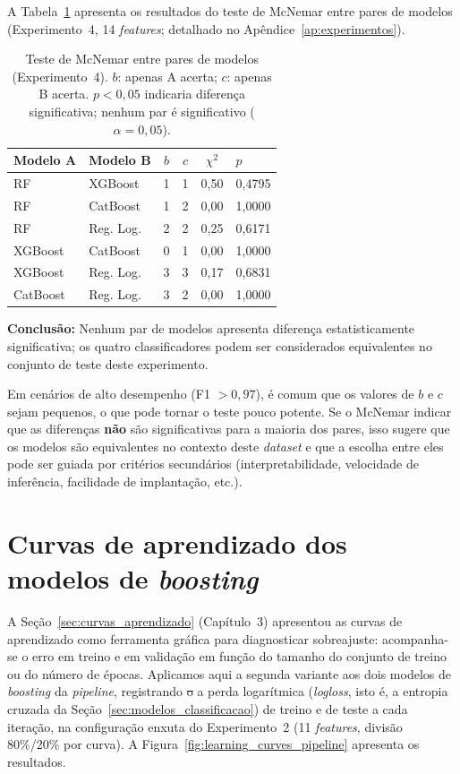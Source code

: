 \documentclass[msc]{on} %
\makeatletter
\providecommand{\DIFaddtex}[1]{{\protect\color{red}#1}} %
\providecommand{\DIFdeltex}[1]{{\protect\color{red}\sout{#1}}} %
\providecommand{\DIFaddbegin}{} %
\providecommand{\DIFaddend}{} %
\providecommand{\DIFdelbegin}{} %
\providecommand{\DIFdelend}{} %
\providecommand{\DIFadd}[1]{\texorpdfstring{\DIFaddtex{#1}}{#1}} %
\providecommand{\DIFdel}[1]{\texorpdfstring{\DIFdeltex{#1}}{}} %
\let\sout@orig\sout %
\renewcommand{\sout}[1]{\ifmmode\text{\sout@orig{\ensuremath{#1}}}\else\sout@orig{#1}\fi} %
\makeatother
\begin{document}
A Tabela~\ref{tab:mcnemar} apresenta os resultados do teste de McNemar entre pares de modelos (Experimento~4, 14 \textit{features}; detalhado no Apêndice~\ref{ap:experimentos}).

\begin{table}[htbp]
\centering
\small
\caption{Teste de McNemar entre pares de modelos (Experimento~4). $b$: apenas A acerta; $c$: apenas B acerta. $p < 0{,}05$ indicaria diferença significativa; nenhum par é significativo ($\alpha = 0{,}05$).}
\label{tab:mcnemar}
\begin{tabular}{@{}llcccl@{}}
\hline
\textbf{Modelo A} & \textbf{Modelo B} & $b$ & $c$ & $\chi^2$ & $p$ \\
\hline
RF & XGBoost       & 1 & 1 & 0,50 & 0,4795 \\
RF & CatBoost      & 1 & 2 & 0,00 & 1,0000 \\
RF & Reg. Log.     & 2 & 2 & 0,25 & 0,6171 \\
XGBoost & CatBoost  & 0 & 1 & 0,00 & 1,0000 \\
XGBoost & Reg. Log. & 3 & 3 & 0,17 & 0,6831 \\
CatBoost & Reg. Log.& 3 & 2 & 0,00 & 1,0000 \\
\hline
\end{tabular}
\end{table}

\textbf{Conclusão:} Nenhum par de modelos apresenta diferença estatisticamente significativa; os quatro classificadores podem ser considerados equivalentes no conjunto de teste deste experimento.

Em cenários de alto desempenho (F1 $> 0{,}97$), é comum que os valores de $b$ e $c$ sejam pequenos, o que pode tornar o teste pouco potente. Se o McNemar indicar que as diferenças \textbf{não} são significativas para a maioria dos pares, isso sugere que os modelos são equivalentes no contexto deste \textit{dataset} e que a escolha entre eles pode ser guiada por critérios secundários (interpretabilidade, velocidade de inferência, facilidade de implantação\DIFaddbegin \DIFadd{, etc.}\DIFaddend ).

\section{Curvas de aprendizado dos modelos de \textit{boosting}}
\label{sec:curvas_aprendizado_exp}

A Seção~\ref{sec:curvas_aprendizado} (Capítulo~3) apresentou as curvas de aprendizado como ferramenta gráfica para diagnosticar sobreajuste: acompanha-se o erro em treino e em validação em função do tamanho do conjunto de treino ou do número de épocas. Aplicamos aqui a segunda variante aos dois modelos de \textit{boosting} da \textit{pipeline}, registrando \DIFdelbegin \DIFdel{o }\DIFdelend \DIFaddbegin \DIFadd{a perda logarítmica (}\DIFaddend \textit{logloss}\DIFaddbegin \DIFadd{, isto é, a entropia cruzada da Seção~\ref{sec:modelos_classificacao}) }\DIFaddend de treino e de teste a cada iteração, na configuração enxuta do Experimento~2 (11 \textit{features}, divisão 80\%/20\% por curva). A Figura~\ref{fig:learning_curves_pipeline} apresenta os resultados.
\end{document}
